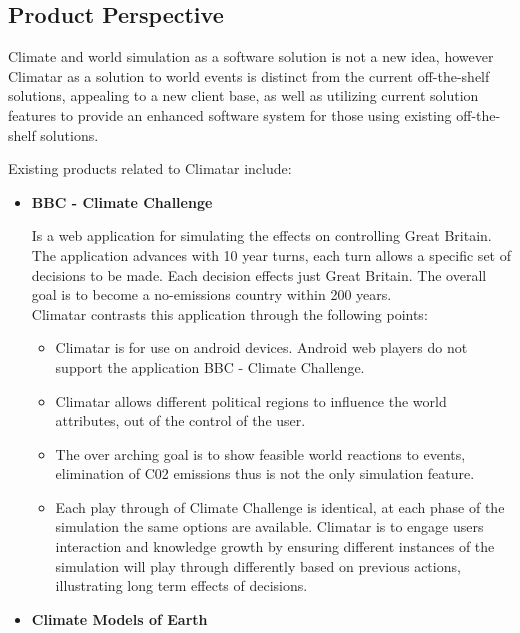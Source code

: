 \documentclass[]{article}
\begin{document}
\subsection{Product Perspective}
\label{sub:product_perspective}

Climate and world simulation as a software solution is not a new idea, however Climatar as a solution to world events is distinct from the current off-the-shelf solutions, appealing to a new client base, as well as utilizing current solution features to provide an enhanced software system for those using existing off-the-shelf solutions.

Existing products related to Climatar include: 
\begin{itemize}
	\item \textbf{BBC - Climate Challenge} 
		
		\cite{BBC}Is a web application for simulating the effects on controlling Great Britain. The application advances with 10 year turns, each turn allows a specific set of decisions to be made. Each decision effects just Great Britain. The overall goal is to become a no-emissions country within 200 years. \\
		Climatar contrasts this application through the following points:
		\begin{itemize}
			\item Climatar is for use on android devices. Android web players do not support the application BBC - Climate Challenge.
			\item Climatar allows different political regions to influence the world attributes, out of the control of the user.
			\item The over arching goal is to show feasible world reactions to events, elimination of C02 emissions thus is not the only simulation feature.
			\item Each play through of Climate Challenge is identical, at each phase of the simulation the same options are available. Climatar is to engage users interaction and knowledge growth by ensuring different instances of the simulation will play through differently based on previous actions, illustrating long term effects of decisions.
		\end{itemize}
	
	\item \textbf{Climate Models of Earth}


\end{itemize}
\end{document}
